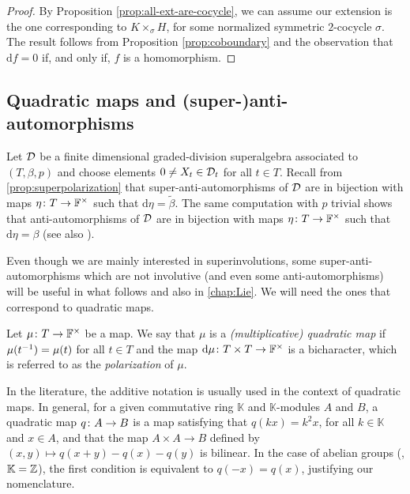 \begin{proof}
	By Proposition \ref{prop:all-ext-are-cocycle}, we can assume our extension is the one corresponding to $K \times_\sigma H$, for some normalized symmetric $2$-cocycle $\sigma$.
	The result follows from Proposition \ref{prop:coboundary} and the observation that $\mathrm{d}f = 0$ if, and only if, $f$ is a homomorphism.
\end{proof}

\subsection{Quadratic maps and (super-)anti-automorphisms}

Let $\mathcal{D}$ be a finite dimensional graded-division superalgebra associated to $(T, \beta, p)$ and choose elements $0\neq X_t \in \mathcal{D}_t$ for all $t\in T$. 
Recall from \cref{prop:superpolarization} that super-anti-automorphisms of $\mathcal{D}$ are in bijection with maps $\eta\colon T \to \mathbb{F}^\times$ such that $\mathrm{d}\eta = \tilde\beta$. 
The same computation with $p$ trivial shows that anti-automorphisms of $\mathcal{D}$ are in bijection with maps $\eta\colon T \to \mathbb{F}^\times$ such that $\mathrm{d}\eta = \beta$ (see also \cite{livromicha}). 

Even though we are mainly interested in superinvolutions, some su\-per-an\-ti-au\-to\-mor\-phisms which are not involutive (and even some an\-ti-au\-to\-mor\-phisms) will be useful in what follows and also in \cref{chap:Lie}. 
We will need the ones that correspond to quadratic maps.

\begin{defi}
	Let $\mu\colon T \to \mathbb{F}^\times$ be a map.
	We say that $\mu$ is a \emph{(multiplicative) quadratic map} if $\mu(t^{-1}) = \mu (t)$ for all $t\in T$ and the map $\mathrm{d}\mu\colon T\times T \to \mathbb{F}^\times$ 
	is a bicharacter, which is referred to as the \emph{polarization} of $\mu$.
\end{defi}

\begin{remark}
	In the literature, the additive notation is usually used in the context of quadratic maps.
	In general, for a given commutative ring $\mathbb K$ and $\mathbb K$-modules $A$ and $B$, a quadratic map $q\colon A \to B$ is a map satisfying that $q(kx) = k^2 x$, for all $k\in \mathbb K$ and $x \in A$, and that the map $A \times A \to B$ defined by $(x,y) \mapsto q(x+y) - q(x) - q(y)$ is bilinear.
	In the case of abelian groups (\ie, $\mathbb K = \mathbb{Z}$), the first condition is equivalent to $q(-x) = q(x)$, justifying our nomenclature. 
\end{remark}

